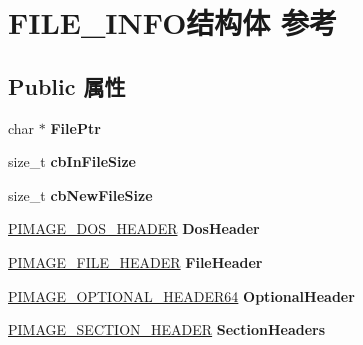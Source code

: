 \hypertarget{struct_f_i_l_e___i_n_f_o}{}\section{F\+I\+L\+E\+\_\+\+I\+N\+F\+O结构体 参考}
\label{struct_f_i_l_e___i_n_f_o}
\subsection*{Public 属性}
\begin{DoxyCompactItemize}
\item 
\mbox{\label{struct_f_i_l_e___i_n_f_o_a35d4c5f05703da8bae67747d430a485a}} 
char $\ast$ {\bfseries File\+Ptr}
\item 
\mbox{\label{struct_f_i_l_e___i_n_f_o_a341c82a7bfcbb643352b6818ec8214c8}} 
size\+\_\+t {\bfseries cb\+In\+File\+Size}
\item 
\mbox{\label{struct_f_i_l_e___i_n_f_o_acfdf53ff73be519403e039a9ed4a0d63}} 
size\+\_\+t {\bfseries cb\+New\+File\+Size}
\item 
\mbox{\label{struct_f_i_l_e___i_n_f_o_afab9cc04b75c785e9bdae3b99ed3f605}} 
\hyperlink{struct___i_m_a_g_e___d_o_s___h_e_a_d_e_r}{P\+I\+M\+A\+G\+E\+\_\+\+D\+O\+S\+\_\+\+H\+E\+A\+D\+ER} {\bfseries Dos\+Header}
\item 
\mbox{\label{struct_f_i_l_e___i_n_f_o_a232959690a4495f6a9746f28c1dd5db2}} 
\hyperlink{struct___i_m_a_g_e___f_i_l_e___h_e_a_d_e_r}{P\+I\+M\+A\+G\+E\+\_\+\+F\+I\+L\+E\+\_\+\+H\+E\+A\+D\+ER} {\bfseries File\+Header}
\item 
\mbox{\label{struct_f_i_l_e___i_n_f_o_ac21e5f513bb573e78ed2c0b6d7e2d9fe}} 
\hyperlink{struct___i_m_a_g_e___o_p_t_i_o_n_a_l___h_e_a_d_e_r64}{P\+I\+M\+A\+G\+E\+\_\+\+O\+P\+T\+I\+O\+N\+A\+L\+\_\+\+H\+E\+A\+D\+E\+R64} {\bfseries Optional\+Header}
\item 
\mbox{\label{struct_f_i_l_e___i_n_f_o_aadd6ed5310e3092a525faaa15837b562}} 
\hyperlink{struct___i_m_a_g_e___s_e_c_t_i_o_n___h_e_a_d_e_r}{P\+I\+M\+A\+G\+E\+\_\+\+S\+E\+C\+T\+I\+O\+N\+\_\+\+H\+E\+A\+D\+ER} {\bfseries Section\+Headers}

\end{DoxyCompactItemize}
